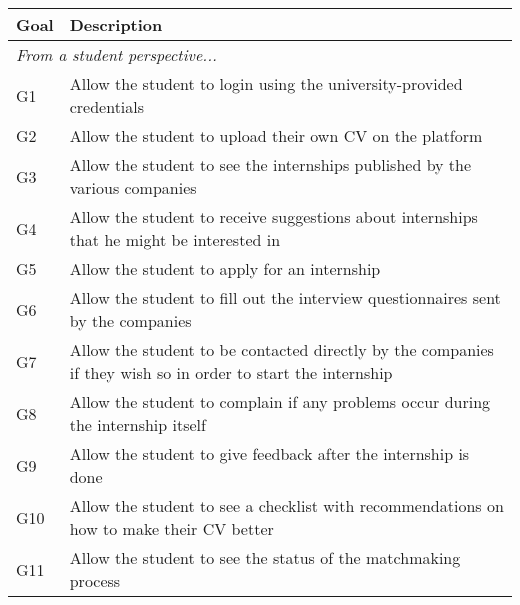 \begin{table}[H]
    \centering
    \begin{tabular}{|l|p{}|}
        \hline
        \textbf{Goal} & \textbf{Description}                                                                                         \\
        \hline
        \multicolumn{2}{|l|}{\textit{From a student perspective...}}                                                                 \\
        \hline
        G1            & Allow the student to login using the university-provided credentials                                         \\
        \hline
        G2            & Allow the student to upload their own CV on the platform                                                     \\
        \hline
        G3            & Allow the student to see the internships published by the various companies                                  \\
        \hline
        G4            & Allow the student to receive suggestions about internships that he might be interested in                    \\
        \hline
        G5            & Allow the student to apply for an internship                                                                 \\
        \hline
        G6            & Allow the student to fill out the interview questionnaires sent by the companies                             \\
        \hline
        G7            & Allow the student to be contacted directly by the companies if they wish so in order to start the internship \\
        \hline
        G8            & Allow the student to complain if any problems occur during the internship itself                             \\
        \hline
        G9            & Allow the student to give feedback after the internship is done                                              \\
        \hline
        G10           & Allow the student to see a checklist with recommendations on how to make their CV better                     \\
        \hline
        G11           & Allow the student to see the status of the matchmaking process                                               \\

\end{tabular}
\end{table}

